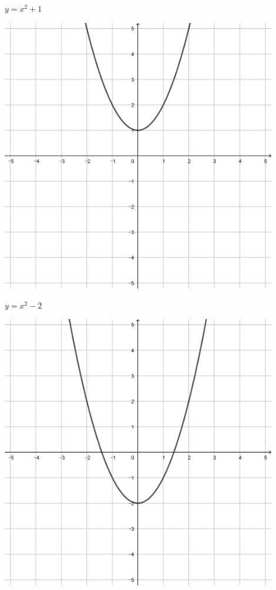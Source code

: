 \documentclass[a4paper]{oblivoir}
\begin{document}
\begin{minipage}{0.45\textwidth}\centering
\(y=x^2+1\)
\par\bigskip\includegraphics[width=0.9\textwidth]{img/7-5}
\end{minipage}
\begin{minipage}{0.45\textwidth}\centering
\(y=x^2-2\)
\par\bigskip\includegraphics[width=0.9\textwidth]{img/7-6}
\end{minipage}\bigskip\bigskip\par
\end{document}
